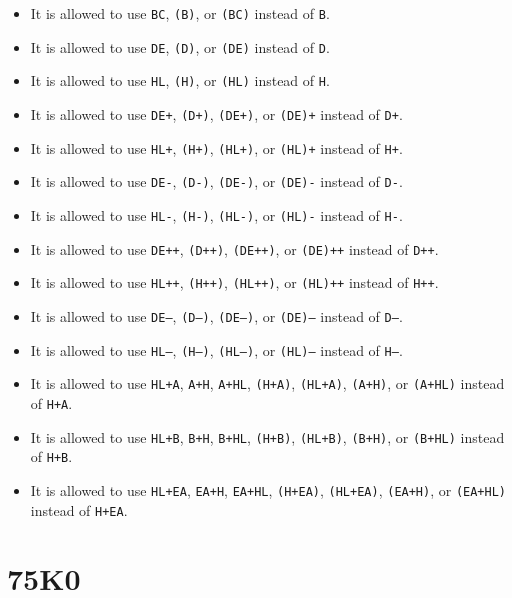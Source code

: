 \documentclass[12pt,twoside]{report}
\newcommand{\tty}[1]{{\tt #1}}
\begin{document}
\begin{itemize}
\item{It is allowed to use \tty{BC}, \tty{(B)}, or \tty{(BC)}
      instead of \tty{B}.}
\item{It is allowed to use \tty{DE}, \tty{(D)}, or \tty{(DE)}
      instead of \tty{D}.}
\item{It is allowed to use \tty{HL}, \tty{(H)}, or \tty{(HL)}
      instead of \tty{H}.}
\item{It is allowed to use \tty{DE+}, \tty{(D+)}, \tty{(DE+)},
      or \tty{(DE)+} instead of \tty{D+}.}
\item{It is allowed to use \tty{HL+}, \tty{(H+)}, \tty{(HL+)},
      or \tty{(HL)+} instead of \tty{H+}.}
\item{It is allowed to use \tty{DE-}, \tty{(D-)}, \tty{(DE-)},
      or \tty{(DE)-} instead of \tty{D-}.}
\item{It is allowed to use \tty{HL-}, \tty{(H-)}, \tty{(HL-)},
      or \tty{(HL)-} instead of \tty{H-}.}
\item{It is allowed to use \tty{DE++}, \tty{(D++)}, \tty{(DE++)},
      or \tty{(DE)++} instead of \tty{D++}.}
\item{It is allowed to use \tty{HL++}, \tty{(H++)}, \tty{(HL++)},
      or \tty{(HL)++} instead of \tty{H++}.}
\item{It is allowed to use \tty{DE--}, \tty{(D--)}, \tty{(DE--)},
      or \tty{(DE)--} instead of \tty{D--}.}
\item{It is allowed to use \tty{HL--}, \tty{(H--)}, \tty{(HL--)},
      or \tty{(HL)--} instead of \tty{H--}.}
\item{It is allowed to use \tty{HL+A}, \tty{A+H}, \tty{A+HL},
      \tty{(H+A)}, \tty{(HL+A)}, \tty{(A+H)}, or \tty{(A+HL)}
      instead of \tty{H+A}.}
\item{It is allowed to use \tty{HL+B}, \tty{B+H}, \tty{B+HL},
      \tty{(H+B)}, \tty{(HL+B)}, \tty{(B+H)}, or \tty{(B+HL)}
      instead of \tty{H+B}.}
\item{It is allowed to use \tty{HL+EA}, \tty{EA+H}, \tty{EA+HL},
      \tty{(H+EA)}, \tty{(HL+EA)}, \tty{(EA+H)}, or \tty{(EA+HL)}
      instead of \tty{H+EA}.}
\end{itemize}


\section{75K0}
\label{75K0Spec}
\end{document}
